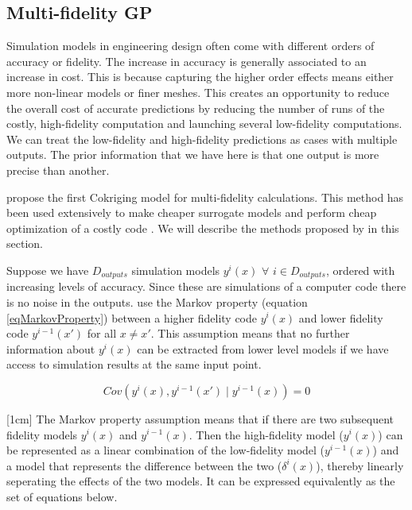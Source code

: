 \subsection{Multi-fidelity GP}\label{secMultiFidelityMTGP}
Simulation models in engineering design often come with different orders of accuracy or fidelity. The increase in accuracy is generally associated to an increase in cost. This is because capturing the higher order effects means either more non-linear models or finer meshes. This creates an opportunity to reduce the overall cost of accurate predictions by reducing the number of runs of the costly, high-fidelity computation and launching several low-fidelity computations. We can treat the low-fidelity and high-fidelity predictions as cases with multiple outputs. The prior information that we have here is that one output is more precise than another. 

\cite{kennedy2000predicting, o1998markov} propose the first Cokriging model for multi-fidelity calculations. This method has been used extensively to make cheaper surrogate models and perform cheap optimization of a costly code \cite{forrester2007multi, march2012provably}. We will describe the methods proposed by \cite{o1998markov} in this section. 

Suppose we have $D_{outputs}$ simulation models $y^{i}(x)$  $\forall$ $ i \in D_{outputs}$, ordered with increasing levels of accuracy. Since these are simulations of a computer code there is no noise in the outputs. \cite{o1998markov} use the Markov property (equation \ref{eqMarkovProperty}) between a higher fidelity code $y^{i}(x)$ and lower fidelity code $y^{i-1}(x')$ for all $x \neq x'$. This assumption means that no further information about $y^{i}(x)$ can be extracted from lower level models if we have access to simulation results at the same input point. 

\begin{equation}\label{eqMarkovProperty}
         Cov(y^{i}(x), y^{i-1}(x') \mid y^{i-1}(x)) = 0
\end{equation}

[1cm]
The Markov property assumption means that if there are two subsequent fidelity models $y^{i}(x)$ and $y^{i-1}(x)$. Then the high-fidelity model ($y^{i}(x)$) can be represented as a linear combination of the low-fidelity model ($y^{i-1}(x)$) and a model that represents the difference between the two ($\delta^{i}(x)$), thereby linearly seperating the effects of the two models. It can be expressed equivalently as the set of equations below. 


